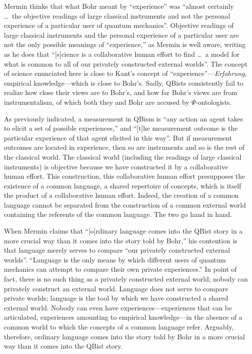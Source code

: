 \documentclass[smallextended]{svjour3}
\begin{document}
Mermin thinks that what Bohr meant by ``experience'' was ``almost certainly \dots\ the objective readings of large classical instruments and not the personal experience of a particular user of quantum mechanics''.\cite{MerminQBnotCop} Objective readings of large classical instruments and the personal experience of a particular user are not the only possible meanings of ``experience,'' as Mermin is well aware, writing as he does that  ``[s]cience is a collaborative human effort to find \dots\ a model for what is common to all of our privately constructed external worlds''.\cite{MerminQBnotCop} The concept of science enunciated here is close to Kant's concept of ``experience''---\emph{Erfahrung}, empirical knowledge---which is close to Bohr's. Sadly, QBists consistently fail to realize how close their views are to Bohr's, and how far Bohr's views are from instrumentalism, of which both they and Bohr are accused by $\Psi$-ontologists.

As previously indicated, a measurement in QBism is ``any action an agent takes to elicit a set of possible experiences,'' and ``[t]he measurement outcome is the particular experience of that agent elicited in this way''.\cite{FMS2014} But if measurement outcomes are located in experience, then so are instruments and so is the rest of the classical world. The classical world (including the readings of large classical instruments) is objective because we have constructed it by a collaborative human effort. This construction, this collaborative human effort presupposes the existence of a common language, a shared repertoire of concepts, which is itself the product of a collaborative human effort. Indeed, the creation of a common language cannot be separated from the construction of a {common} external world containing the referents of the common language. The two go hand in hand.

When Mermin claims that ``[o]rdinary language comes into the QBist story in a more crucial way than it comes into the story told by Bohr,'' his contention is that language merely serves to compare ``our privately constructed external worlds''.\cite{MerminQBnotCop} ``Language is the only means by which different users of quantum mechanics can attempt to compare their own private experiences.''  In point of fact, there is no such thing as a privately constructed external world; nobody can privately construct an external world. Language does not serve to compare private worlds; language is the tool by which we have constructed a shared external world. Nobody can even have experiences---experiences that can be articulated, experiences amounting to empirical knowledge---in the absence of a common world to which the concepts of a common language refer. Arguably, therefore, ordinary language comes into the story told by Bohr in a more crucial way than it comes into the QBist story.
\end{document}
